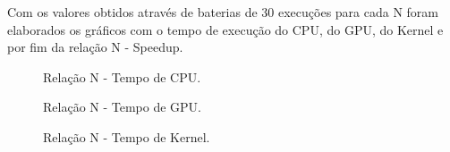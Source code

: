 Com os valores obtidos através de baterias de 30 execuções para cada N foram elaborados os gráficos com o tempo de execução do CPU, do GPU, do Kernel e por fim da relação N - Speedup.

\begin{figure}[H]
	\begin{center}
		\caption{Relação N - Tempo de CPU.}
		\label{cpu}
	\end{center}
\end{figure}

\begin{figure}[H]
	\begin{center}
		\caption{Relação N - Tempo de GPU.}
		\label{gpu}
	\end{center}
\end{figure}

\begin{figure}[H]
	\begin{center}
		\caption{Relação N - Tempo de Kernel.}
		\label{kernel}
	\end{center}
\end{figure}

